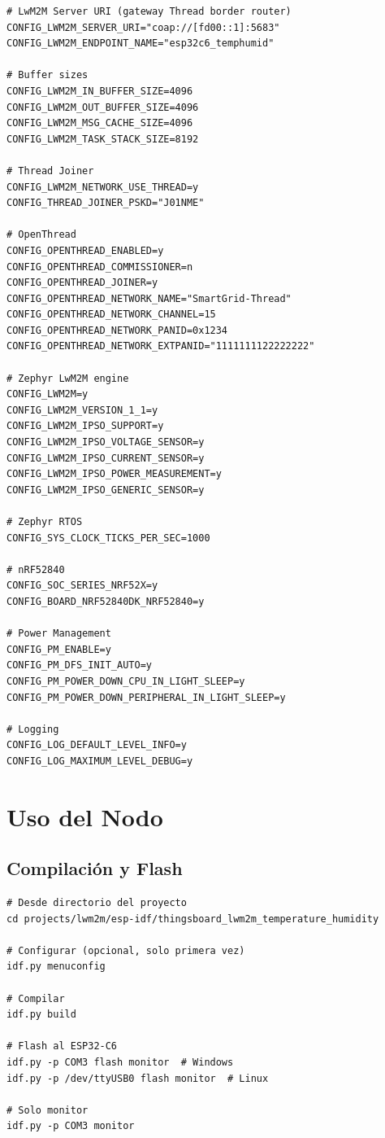 \begin{verbatim}
# LwM2M Server URI (gateway Thread border router)
CONFIG_LWM2M_SERVER_URI="coap://[fd00::1]:5683"
CONFIG_LWM2M_ENDPOINT_NAME="esp32c6_temphumid"

# Buffer sizes
CONFIG_LWM2M_IN_BUFFER_SIZE=4096
CONFIG_LWM2M_OUT_BUFFER_SIZE=4096
CONFIG_LWM2M_MSG_CACHE_SIZE=4096
CONFIG_LWM2M_TASK_STACK_SIZE=8192

# Thread Joiner
CONFIG_LWM2M_NETWORK_USE_THREAD=y
CONFIG_THREAD_JOINER_PSKD="J01NME"

# OpenThread
CONFIG_OPENTHREAD_ENABLED=y
CONFIG_OPENTHREAD_COMMISSIONER=n
CONFIG_OPENTHREAD_JOINER=y
CONFIG_OPENTHREAD_NETWORK_NAME="SmartGrid-Thread"
CONFIG_OPENTHREAD_NETWORK_CHANNEL=15
CONFIG_OPENTHREAD_NETWORK_PANID=0x1234
CONFIG_OPENTHREAD_NETWORK_EXTPANID="1111111122222222"

# Zephyr LwM2M engine
CONFIG_LWM2M=y
CONFIG_LWM2M_VERSION_1_1=y
CONFIG_LWM2M_IPSO_SUPPORT=y
CONFIG_LWM2M_IPSO_VOLTAGE_SENSOR=y
CONFIG_LWM2M_IPSO_CURRENT_SENSOR=y
CONFIG_LWM2M_IPSO_POWER_MEASUREMENT=y
CONFIG_LWM2M_IPSO_GENERIC_SENSOR=y

# Zephyr RTOS
CONFIG_SYS_CLOCK_TICKS_PER_SEC=1000

# nRF52840
CONFIG_SOC_SERIES_NRF52X=y
CONFIG_BOARD_NRF52840DK_NRF52840=y

# Power Management
CONFIG_PM_ENABLE=y
CONFIG_PM_DFS_INIT_AUTO=y
CONFIG_PM_POWER_DOWN_CPU_IN_LIGHT_SLEEP=y
CONFIG_PM_POWER_DOWN_PERIPHERAL_IN_LIGHT_SLEEP=y

# Logging
CONFIG_LOG_DEFAULT_LEVEL_INFO=y
CONFIG_LOG_MAXIMUM_LEVEL_DEBUG=y
\end{verbatim}

\section{Uso del Nodo}

\subsection{Compilación y Flash}

\begin{verbatim}
# Desde directorio del proyecto
cd projects/lwm2m/esp-idf/thingsboard_lwm2m_temperature_humidity

# Configurar (opcional, solo primera vez)
idf.py menuconfig

# Compilar
idf.py build

# Flash al ESP32-C6
idf.py -p COM3 flash monitor  # Windows
idf.py -p /dev/ttyUSB0 flash monitor  # Linux

# Solo monitor
idf.py -p COM3 monitor
\end{verbatim}


